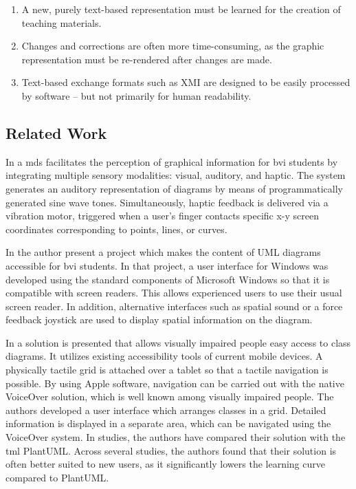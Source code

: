 \renewcommand{\labelenumi}{$-$}
\begin{enumerate}
\item A new, purely text-based representation must be learned for the creation of teaching materials.

\item Changes and corrections are often more time-consuming, as the graphic representation must be re-rendered after changes are made.

\item Text-based exchange formats such as XMI are designed to be easily processed by software – but not primarily for human readability.
\end{enumerate} 
 
\subsection*{Related Work}

In \cite{doore2023} a \ac{mds} facilitates the perception of graphical information for \ac{bvi} students by integrating multiple sensory modalities: visual, auditory, and haptic. 
The system generates an auditory representation of diagrams by means of programmatically generated sine wave tones. Simultaneously, haptic feedback is delivered via a vibration motor, triggered when a user’s finger contacts specific x-y screen coordinates corresponding to points, lines, or curves. 

In \cite{king2007} the author present a project which makes  the content of UML diagrams accessible for \ac{bvi} students. In that project, a user interface for Windows was developed using the standard components of Microsoft Windows so that it is compatible with screen readers. This allows experienced users to use their usual screen reader. In addition, alternative interfaces such as spatial sound or a force feedback joystick are used to display spatial information on the diagram. 



In \cite{wildhaber2020} a solution is presented that allows visually impaired people easy access to class diagrams.
It utilizes existing accessibility tools of current mobile devices. A physically tactile grid is attached over a tablet so that a tactile navigation is possible.
By using Apple software, navigation can be carried out with the native VoiceOver solution, which is well known among  visually impaired people.
The authors developed a user interface which arranges classes in a grid.  Detailed information is displayed in a separate area, which can be navigated using the  VoiceOver system. 
In studies, the authors have compared their solution with the \ac{tml} PlantUML. Across several studies, the authors found that their solution is often better suited to new users, as it significantly lowers the learning curve compared to PlantUML.